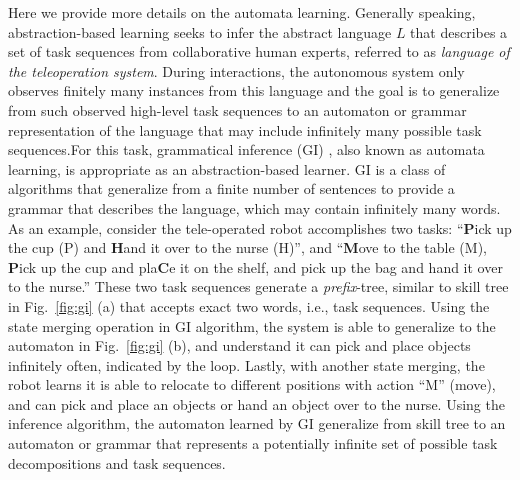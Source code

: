 \documentclass[letterpaper, 11 pt, onecolumn]{article}
\begin{document}
Here we provide more details on the automata learning. Generally speaking, abstraction-based learning seeks to infer the abstract language $L$ that describes  a set of task sequences from collaborative human experts, referred to as  \emph{language of the teleoperation system}. During interactions, the autonomous system only observes finitely many instances from this language and the goal is to generalize from such observed high-level task sequences to an automaton or grammar representation of the language that may include infinitely many possible task sequences.For this task, grammatical inference (GI) \cite{de2010grammatical}, also known as automata learning, is appropriate as an abstraction-based learner. GI is a class of algorithms that generalize from a finite number of sentences to provide a grammar that describes the language, which may contain infinitely many words. As an example, consider the tele-operated robot accomplishes two tasks:  ``\textbf{P}ick up the cup (P) and \textbf{H}and it over to the nurse (H)'', and 
``\textbf{M}ove to the table (M), \textbf{P}ick up the cup and pla\textbf{C}e it on the shelf, and pick up the bag and hand it over to the nurse.'' These two task sequences generate a \emph{prefix}-tree, similar to skill tree \cite{konidaris2018skills} in Fig.~\ref{fig:gi} (a) that accepts exact two words, i.e., task sequences. Using the state merging operation \cite{de2010grammatical} in GI algorithm, the system is able to generalize to the automaton in Fig.~\ref{fig:gi} (b), and understand it can pick and place objects infinitely often, indicated by the loop. Lastly, with another state merging, the robot learns it is able to relocate to different positions with action ``M'' (move), and can pick and place an objects or hand an object over to the nurse. Using the inference algorithm, the automaton learned by GI generalize from skill tree to an automaton or grammar that represents a potentially infinite set of possible task decompositions and task sequences.
\end{document}
